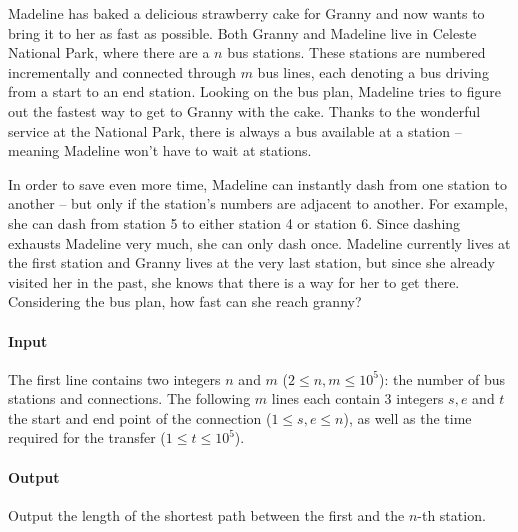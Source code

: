 



\makeheader

Madeline has baked a delicious strawberry cake for Granny and now wants to bring it to her as fast as possible.
Both Granny and Madeline live in Celeste National Park, where there are a $n$ bus stations.
These stations are numbered incrementally and connected through $m$ bus lines, each denoting a bus driving from a start to an end station.
Looking on the bus plan, Madeline tries to figure out the fastest way to get to Granny with the cake.
Thanks to the wonderful service at the National Park, there is always a bus available at a station -- meaning Madeline won't have to wait at stations.


In order to save even more time, Madeline can instantly dash from one station to another -- but only if the station's numbers are adjacent to another.
For example, she can dash from station 5 to either station 4 or station 6.
Since dashing exhausts Madeline very much, she can only dash once.
Madeline currently lives at the first station and Granny lives at the very last station, but since she already visited her in the past, she knows that there is a way for her to get there.
Considering the bus plan, how fast can she reach granny?

\paragraph*{Input}

The first line contains two integers $n$ and $m$ ($2 \leq n,m \leq 10^5$): the number of bus stations and connections.
The following $m$ lines each contain 3 integers $s,e$ and $t$ the start and end point of the connection ($1 \leq s,e \leq n$), as well as the time required for the transfer ($1 \leq t \leq 10^5$).

\paragraph*{Output}

Output the length of the shortest path between the first and the $n$-th station.

\begin{samples}
\end{samples}


